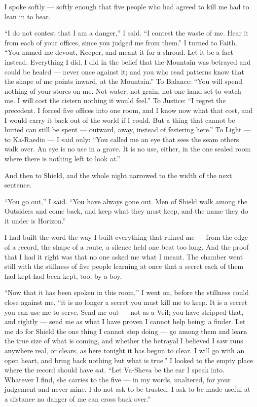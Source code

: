 I spoke softly --- softly enough that five people who had agreed to kill me had to lean in to hear.\par

``I do not contest that I am a danger,'' I said. ``I contest the waste of me. Hear it from each of your offices, since you judged me from them.'' I turned to Faith. ``You named me devout, Keeper, and meant it for a shroud. Let it be a fact instead. Everything I did, I did in the belief that the Mountain was betrayed and could be healed --- never once against it; and you who read patterns know that the shape of me points inward, at the Mountain.'' To Balance: ``You will spend nothing of your stores on me. Not water, not grain, not one hand set to watch me. I will cost the cistern nothing it would feel.'' To Justice: ``I regret the precedent. I forced five offices into one room, and I know now what that cost, and I would carry it back out of the world if I could. But a thing that cannot be buried can still be spent --- outward, away, instead of festering here.'' To Light --- to Ka-Raedin --- I said only: ``You called me an eye that sees the seam others walk over. An eye is no use in a grave. It is no use, either, in the one sealed room where there is nothing left to look at.''\par

And then to Shield, and the whole night narrowed to the width of the next sentence.\par

``You go out,'' I said. ``You have always gone out. Men of Shield walk among the Outsiders and come back, and keep what they must keep, and the name they do it under is Horizon.''\par

I had built the word the way I built everything that ruined me --- from the edge of a record, the shape of a route, a silence held one beat too long. And the proof that I had it right was that no one asked me what I meant. The chamber went still with the stillness of five people learning at once that a secret each of them had kept had been kept, too, by a boy.\par

``Now that it has been spoken in this room,'' I went on, before the stillness could close against me, ``it is no longer a secret you must kill me to keep. It is a secret you can use me to serve. Send me out --- not as a Veil; you have stripped that, and rightly --- send me as what I have proven I cannot help being: a finder. Let me do for Shield the one thing I cannot stop doing --- go among them and learn the true size of what is coming, and whether the betrayal I believed I saw runs anywhere real, or clears, as here tonight it has begun to clear. I will go with an open heart, and bring back nothing but what is true.'' I looked to the empty place where the record should have sat. ``Let Va-Sheva be the ear I speak into. Whatever I find, she carries to the five --- in my words, unaltered, for your judgement and never mine. I do not ask to be trusted. I ask to be made useful at a distance no danger of me can cross back over.''\par

